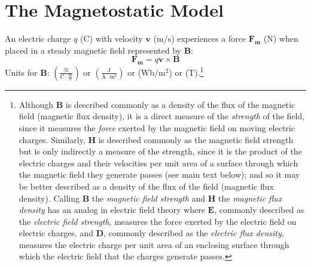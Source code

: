 \section{The Magnetostatic Model}\label{sec:magnetostatics}
An electric charge $q$ (C) with velocity $\mathbf{v}$ (m/s) experiences a force $\mathbf{F_m}$ (N) when placed in a steady magnetic field represented by $\mathbf{B}$:
\begin{equation}\label{F m}
\mathbf{F_m} = q \mathbf{v} \times \mathbf{B}
\end{equation}
Units for $\mathbf{B}$: $\left( \frac{\mathrm{N}}{\mathrm{C} \cdot \frac{\mathrm{m}}{\mathrm{s}}} \right)$ or $\left( \frac{\mathrm{J}}{\mathrm{A} \cdot \mathrm{m^2}} \right)$ or (Wb/m$^2$) or (T).\footnote{Although $\mathbf{B}$ is described commonly as a density of the flux of the magnetic field (magnetic flux density), it is a direct measure of the \emph{strength} of the field, since it measures the \emph{force} exerted by the magnetic field on moving electric charges.  Similarly, $\mathbf{H}$ is described commonly as the magnetic field strength but is only indirectly a measure of the strength, since it is the product of the electric charges and their velocities per unit area of a surface through which the magnetic field they generate passes (see main text below); and so it may be better described as a density of the flux of the field (magnetic flux density).  Calling $\mathbf{B}$ the \emph{magnetic field strength} and $\mathbf{H}$ the \emph{magnetic flux density} has an analog in electric field theory 
where $\mathbf{E}$, commonly described as the \emph{electric field strength}, measures the force exerted by the electric field on electric charges, and $\mathbf{D}$, commonly described as the \emph{electric flux density}, measures the electric charge per unit area of an enclosing surface through which the electric field that the charges generate passes.%
}


